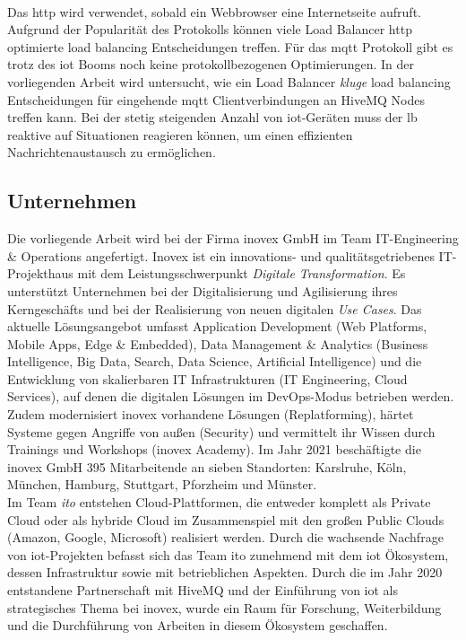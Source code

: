 \\
Das \ac{http} wird verwendet, sobald ein Webbrowser eine Internetseite aufruft. Aufgrund der Popularität des Protokolls können viele Load Balancer \ac{http} optimierte load balancing Entscheidungen treffen.
Für das \ac{mqtt} Protokoll gibt es trotz des \acl{iot} Booms noch keine protokollbezogenen Optimierungen.
In der vorliegenden Arbeit wird untersucht, wie ein Load Balancer \textit{kluge} load balancing Entscheidungen für eingehende \ac{mqtt} Clientverbindungen an HiveMQ Nodes treffen kann.
Bei der stetig steigenden Anzahl von \ac{iot}-Geräten muss der \acl{lb} reaktive auf Situationen reagieren können, um einen effizienten Nachrichtenaustausch zu ermöglichen.
\begin{comment}
\\
Envoy ist ein Load Balancer, der dynamisch von einer Control Plane konfiguriert werden kann.
Zudem können anwendungsspezifische Netzwerkfilter programmiert und in die Pipeline eingebunden werden.
Diese Features ermöglichen eine individuelle Anpassung des Load Balancers an einen gegebenen Anwendungsfall.
Neben der Analyse von \ac{mqtt} load balancing Kriterien, werden sie ebenfalls in der vorliegenden Arbeit in einer Envoy Control Plane implementiert.
\end{comment}

\subsection{Unternehmen}
Die vorliegende Arbeit wird bei der Firma inovex GmbH im Team IT-Engineering \& Operations angefertigt.
Inovex ist ein innovations- und qualitätsgetriebenes IT-Projekthaus mit dem Leistungsschwerpunkt \textit{Digitale Transformation}.
Es unterstützt Unternehmen bei der Digitalisierung und Agilisierung ihres Kerngeschäfts und bei der Realisierung von neuen digitalen \textit{Use Cases}.
Das aktuelle Lösungsangebot umfasst Application Development (Web Platforms, Mobile Apps, Edge \& Embedded), Data Management \& Analytics (Business Intelligence, Big Data, Search, Data Science, Artificial Intelligence) und die Entwicklung von skalierbaren IT Infrastrukturen (IT Engineering, Cloud Services), auf denen die digitalen Lösungen im DevOps-Modus betrieben werden.
Zudem modernisiert inovex vorhandene Lösungen (Replatforming), härtet Systeme gegen Angriffe von au{\ss}en (Security) und vermittelt ihr Wissen durch Trainings und Workshops (inovex Academy).
Im Jahr 2021 beschäftigte die inovex GmbH 395 Mitarbeitende an sieben Standorten: Karslruhe, Köln, München, Hamburg, Stuttgart, Pforzheim und Münster.
\\
Im Team \textit{\ac{ito}} entstehen Cloud-Plattformen, die entweder komplett als Private Cloud oder als hybride Cloud im Zusammenspiel mit den gro{\ss}en Public Clouds (Amazon, Google, Microsoft) realisiert werden.
Durch die wachsende Nachfrage von \acs{iot}-Projekten befasst sich das Team \ac{ito} zunehmend mit dem \acl{iot} Ökosystem, dessen Infrastruktur sowie mit betrieblichen Aspekten.
Durch die im Jahr 2020 entstandene Partnerschaft mit HiveMQ und der Einführung von \ac{iot} als strategisches Thema bei inovex, wurde ein Raum für Forschung, Weiterbildung und die Durchführung von Arbeiten in diesem Ökosystem geschaffen.

